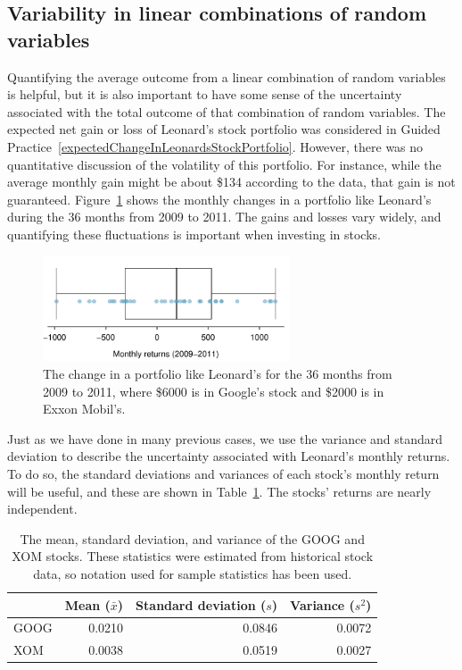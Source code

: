 \subsection{Variability in linear combinations of random variables}

Quantifying the average outcome from a linear combination of random variables is helpful, but it is also important to have some sense of the uncertainty associated with the total outcome of that combination of random variables. The expected net gain or loss of Leonard's stock portfolio was considered in Guided Practice~\ref{expectedChangeInLeonardsStockPortfolio}. However, there was no quantitative discussion of the volatility of this portfolio. For instance, while the average monthly gain might be about \$134 according to the data, that gain is not guaranteed. Figure~\ref{changeInLeonardsStockPortfolioFor36Months} shows the monthly changes in a portfolio like Leonard's during the 36 months from 2009 to 2011. The gains and losses vary widely, and quantifying these fluctuations is important when investing in stocks.

\begin{figure}[ht]
\centering
\includegraphics[width=0.65\textwidth]{ch_probability/figures/changeInLeonardsStockPortfolioFor36Months/changeInLeonardsStockPortfolioFor36Months}
\caption{The change in a portfolio like Leonard's for the 36 months from 2009 to 2011, where \$6000 is in Google's stock and \$2000 is in Exxon Mobil's.}
\label{changeInLeonardsStockPortfolioFor36Months}
\end{figure}

Just as we have done in many previous cases, we use the variance and standard deviation to describe the uncertainty associated with Leonard's monthly returns. To do so, the standard deviations and variances of each stock's monthly return will be useful, and these are shown in Table~\ref{sumStatOfGOOGXOM}. The stocks' returns are nearly independent.

\begin{table}
\centering
\begin{tabular}{lrrr}
\hline
	& Mean ($\bar{x}$) & Standard deviation ($s$) & Variance ($s^2$) \\
\hline
GOOG & 0.0210	& 0.0846					&	0.0072	\\
XOM & 0.0038		& 0.0519					&	0.0027	\\
\hline
\end{tabular}
\caption{The mean, standard deviation, and variance of the GOOG and XOM stocks. These statistics were estimated from historical stock data, so notation used for sample statistics has been used.}
\label{sumStatOfGOOGXOM}
\end{table}

